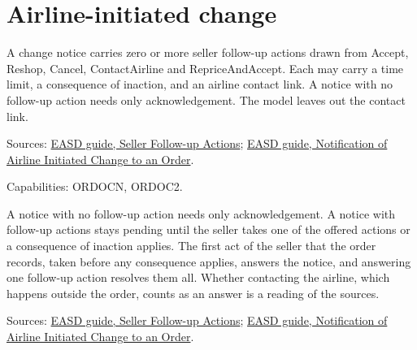 
\section{Airline-initiated change}


\begin{definition}
  \label{def:airline-change-follow-up-action}
  A change notice carries zero or more seller follow-up actions drawn from
  Accept, Reshop, Cancel, ContactAirline and RepriceAndAccept. Each may
  carry a time limit, a consequence of inaction, and an airline contact
  link. A notice with no follow-up action needs only acknowledgement.  The
  model leaves out the contact link.

  Sources: \href{https://standards.atlassian.net/wiki/spaces/EASD/pages/574849094}{EASD guide, Seller Follow-up Actions};
  \href{https://standards.atlassian.net/wiki/spaces/EASD/pages/574455903}{EASD guide, Notification of Airline Initiated Change to an Order}.

  Capabilities: ORDOCN, ORDOC2.
\end{definition}

\begin{definition}
  \label{def:airline-change-answering}
  A notice with no follow-up action needs only acknowledgement.  A notice
  with follow-up actions stays pending until the seller takes one of the
  offered actions or a consequence of inaction applies.  The first act of the
  seller that the order records, taken before any consequence applies,
  answers the notice, and answering one follow-up action resolves them all.
  Whether contacting the airline, which happens outside the order, counts as
  an answer is a reading of the sources.

  Sources: \href{https://standards.atlassian.net/wiki/spaces/EASD/pages/574849094}{EASD guide, Seller Follow-up Actions};
  \href{https://standards.atlassian.net/wiki/spaces/EASD/pages/574455903}{EASD guide, Notification of Airline Initiated Change to an Order}.
\end{definition}

